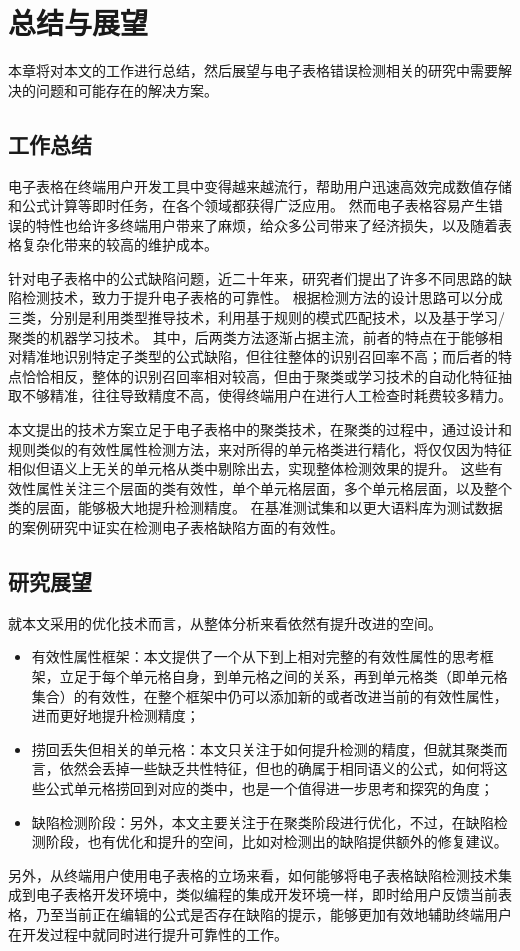 \chapter{总结与展望}

本章将对本文的工作进行总结，然后展望与电子表格错误检测相关的研究中需要解决的问题和可能存在的解决方案。

\section{工作总结}
电子表格在终端用户开发工具中变得越来越流行，帮助用户迅速高效完成数值存储和公式计算等即时任务，在各个领域都获得广泛应用。
然而电子表格容易产生错误的特性也给许多终端用户带来了麻烦，给众多公司带来了经济损失，以及随着表格复杂化带来的较高的维护成本。

针对电子表格中的公式缺陷问题，近二十年来，研究者们提出了许多不同思路的缺陷检测技术，致力于提升电子表格的可靠性。
根据检测方法的设计思路可以分成三类，分别是利用类型推导技术，利用基于规则的模式匹配技术，以及基于学习/聚类的机器学习技术。
其中，后两类方法逐渐占据主流，前者的特点在于能够相对精准地识别特定子类型的公式缺陷，但往往整体的识别召回率不高；而后者的特点恰恰相反，整体的识别召回率相对较高，但由于聚类或学习技术的自动化特征抽取不够精准，往往导致精度不高，使得终端用户在进行人工检查时耗费较多精力。

本文提出的技术方案立足于电子表格中的聚类技术，在聚类的过程中，通过设计和规则类似的有效性属性检测方法，来对所得的单元格类进行精化，将仅仅因为特征相似但语义上无关的单元格从类中剔除出去，实现整体检测效果的提升。
这些有效性属性关注三个层面的类有效性，单个单元格层面，多个单元格层面，以及整个类的层面，能够极大地提升检测精度。
在基准测试集和以更大语料库为测试数据的案例研究中证实\wa 在检测电子表格缺陷方面的有效性。

\section{研究展望}

就本文采用的优化技术而言，\wa 从整体分析来看依然有提升改进的空间。
\begin{itemize}
    \item 有效性属性框架：本文提供了一个从下到上相对完整的有效性属性的思考框架，立足于每个单元格自身，到单元格之间的关系，再到单元格类（即单元格集合）的有效性，在整个框架中仍可以添加新的或者改进当前的有效性属性，进而更好地提升检测精度；
    \item 捞回丢失但相关的单元格：本文只关注于如何提升检测的精度，但就其聚类而言，依然会丢掉一些缺乏共性特征，但也的确属于相同语义的公式，如何将这些公式单元格捞回到对应的类中，也是一个值得进一步思考和探究的角度；
    \item 缺陷检测阶段：另外，本文主要关注于在聚类阶段进行优化，不过，在缺陷检测阶段，也有优化和提升的空间，比如对检测出的缺陷提供额外的修复建议。
\end{itemize}

另外，从终端用户使用电子表格的立场来看，如何能够将电子表格缺陷检测技术集成到电子表格开发环境中，类似编程的集成开发环境一样，即时给用户反馈当前表格，乃至当前正在编辑的公式是否存在缺陷的提示，能够更加有效地辅助终端用户在开发过程中就同时进行提升可靠性的工作。

